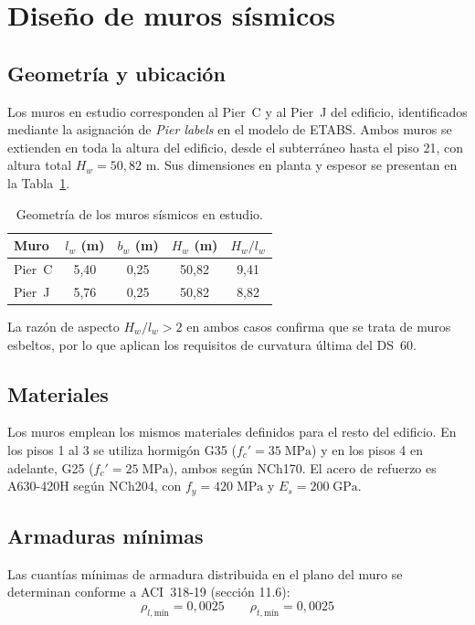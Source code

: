 \section{Diseño de muros sísmicos}

\subsection{Geometría y ubicación}

Los muros en estudio corresponden al Pier~C y al Pier~J del edificio, identificados mediante la
asignación de \textit{Pier labels} en el modelo de ETABS. Ambos muros se extienden en toda la
altura del edificio, desde el subterráneo hasta el piso 21, con altura total $H_w = 50{,}82$ m.
Sus dimensiones en planta y espesor se presentan en la Tabla~\ref{tab:muro_geometria}.

\begin{table}[H]
\centering
\caption{Geometría de los muros sísmicos en estudio.}
\label{tab:muro_geometria}
\begin{tabular}{lcccc}
\hline
Muro & $l_w$ (m) & $b_w$ (m) & $H_w$ (m) & $H_w / l_w$ \\
\hline
Pier~C & 5,40 & 0,25 & 50,82 & 9,41 \\
Pier~J & 5,76 & 0,25 & 50,82 & 8,82 \\
\hline
\end{tabular}
\end{table}

La razón de aspecto $H_w/l_w > 2$ en ambos casos confirma que se trata de muros esbeltos,
por lo que aplican los requisitos de curvatura última del DS~60.

\subsection{Materiales}

Los muros emplean los mismos materiales definidos para el resto del edificio. En los pisos 1 al 3
se utiliza hormigón G35 ($f_c' = 35\;\text{MPa}$) y en los pisos 4 en adelante, G25
($f_c' = 25\;\text{MPa}$), ambos según NCh170. El acero de refuerzo es A630-420H según NCh204,
con $f_y = 420\;\text{MPa}$ y $E_s = 200\;\text{GPa}$.

\subsection{Armaduras mínimas}

Las cuantías mínimas de armadura distribuida en el plano del muro se determinan conforme a
ACI~318-19 (sección 11.6):
\begin{equation}
    \rho_{l,\text{mín}} = 0{,}0025 \qquad \rho_{t,\text{mín}} = 0{,}0025
\end{equation}

